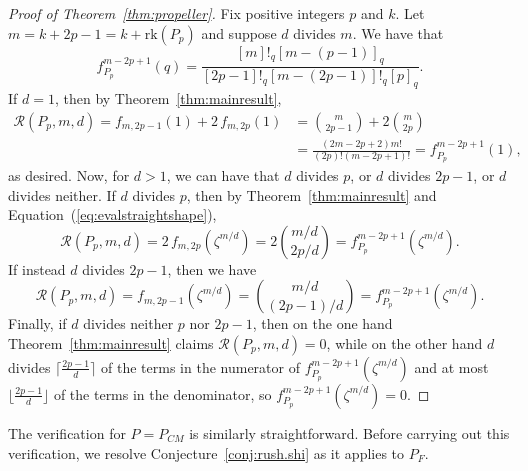\documentclass[12pt]{amsart}
\theoremstyle{definition}
\theoremstyle{remark}
\numberwithin{equation}{section}
\newcommand{\rank}{\ensuremath{\mathrm{rk}}}
\begin{document}
\begin{proof}[Proof of Theorem~\ref{thm:propeller}] Fix positive integers $p$ and $k$. Let $m = k+2p-1 = k + \rank(P_p)$ and suppose $d$ divides $m$. We have that \[ f^{m-2p+1}_{P_p}(q) = \frac{[m]!_q [m-(p-1)]_q}{[2p-1]!_q [m-(2p-1)]!_q [p]_q }.\]  If $d = 1$, then by Theorem~\ref{thm:mainresult}, 
\begin{align*}
 \mathcal{R}(P_p,m,d) = f_{m,2p-1}(1) + 2 \, f_{m,2p}(1) &= \binom{m}{2p-1} + 2 \binom{m}{2p} \\
 &= \frac{(2m-2p+2)m!}{(2p)!(m-2p+1)!} = f^{m-2p+1}_{P_p}(1),
 \end{align*}
 as desired.
Now, for $d > 1$, we can have that $d$ divides $p$, or $d$ divides $2p-1$, or $d$ divides neither. If $d$ divides $p$, then by Theorem~\ref{thm:mainresult} and Equation~(\ref{eq:evalstraightshape}),
\[ \mathcal{R}(P_p,m,d) = 2 \, f_{m,2p}(\zeta^{m/d}) = 2\binom{m/d}{2p/d} = f^{m-2p+1}_{P_p}(\zeta^{m/d}).\]
If instead $d$ divides $2p-1$, then we have
\[ \mathcal{R}(P_p,m,d) =  f_{m,2p-1}(\zeta^{m/d}) = \binom{m/d}{(2p-1)/d} = f^{m-2p+1}_{P_p}(\zeta^{m/d}).\]
Finally, if $d$ divides neither $p$ nor $2p-1$, then on the one hand Theorem~\ref{thm:mainresult} claims $\mathcal{R}(P_p,m,d) = 0$, while on the other hand $d$ divides $\lceil{\frac{2p-1}{d}}\rceil$ of the terms in the numerator of $f^{m-2p+1}_{P_p}(\zeta^{m/d})$ and at most $\lfloor{\frac{2p-1}{d}}\rfloor$ of the terms in the denominator, so $f^{m-2p+1}_{P_p}(\zeta^{m/d}) = 0$. 
\end{proof}

The verification for $P = P_{CM}$ is similarly straightforward. Before carrying out this verification, we resolve Conjecture~\ref{conj:rush.shi} as it applies to $P_F$.
\end{document}
